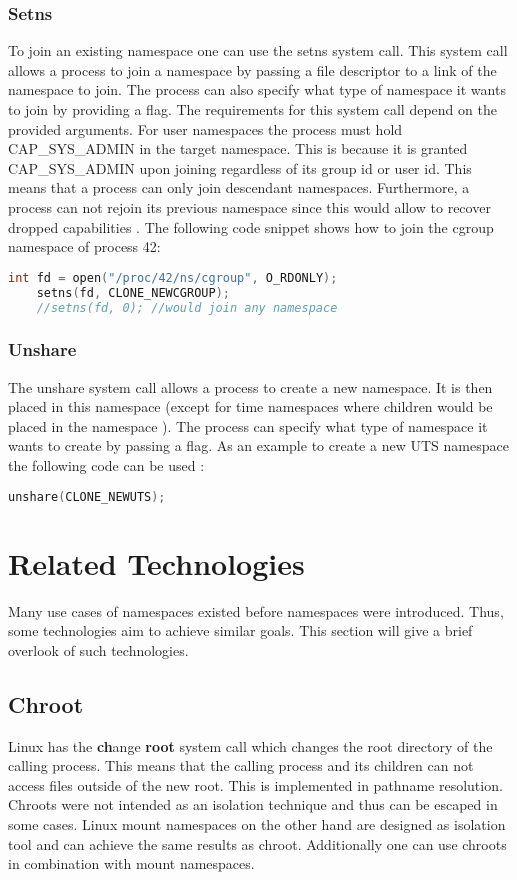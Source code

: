 \documentclass[10pt,twocolumn,a4paper]{article}
\begin{document}
\subsubsection{ Setns}
To join an existing namespace one can use the setns system call.
This system call allows a process to join a namespace by passing a file descriptor to a link of
the namespace to join. 
The process can also specify what type of namespace it wants to join by providing a flag. 
The requirements for this system call depend on the provided arguments. For user namespaces the process
must hold CAP\_SYS\_ADMIN in the target namespace. This is because  it is granted CAP\_SYS\_ADMIN upon joining
regardless of its group id or user id. This means that a process can only
join descendant namespaces. Furthermore, a process can not rejoin its previous namespace since this would allow to recover dropped capabilities \cite{23}. The following code snippet shows how to join the
cgroup namespace of process 42:
\begin{lstlisting}[language=C]
    int fd = open("/proc/42/ns/cgroup", O_RDONLY);
    setns(fd, CLONE_NEWCGROUP);
    //setns(fd, 0); //would join any namespace
\end{lstlisting}


\subsubsection{ Unshare}
The unshare system call allows a process to create a new namespace. It is then  placed in this
namespace (except for time namespaces where children would be placed in the namespace \cite{15}). 
The process can specify what type of namespace it wants to create by passing a flag. As an example to create a new
UTS namespace the following code can be used \cite{24}:
\begin{lstlisting}[language=C]
    unshare(CLONE_NEWUTS);
\end{lstlisting}\section{Related Technologies}\label{sec:related}
Many use cases of namespaces existed before namespaces were introduced. Thus, some technologies aim to achieve similar goals. This section will give a brief overlook of such technologies.
\subsection{Chroot}
Linux has the \textbf{ch}ange \textbf{root} system call which changes the root directory of the calling
process. This means that the calling process and its children can not access files outside of the
new root. This is implemented in pathname resolution\cite{1}. Chroots were not intended as
an isolation technique and thus can be escaped in some cases. Linux mount namespaces on the other hand are designed as isolation tool and can achieve the same results as chroot.
 Additionally one can use chroots in combination with mount namespaces\cite{1,25}. 
\end{document}
